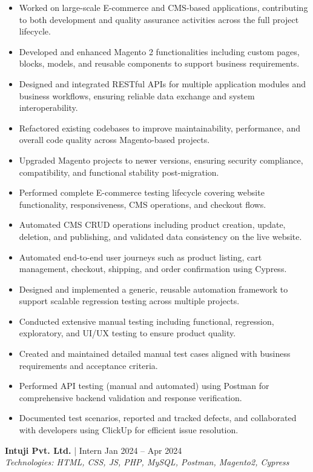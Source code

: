 \documentclass[a4paper,10pt]{article}
\begin{document}
\begin{itemize}
    \item Worked on large-scale E-commerce and CMS-based applications, contributing to both development and quality assurance activities across the full project lifecycle.
    \item Developed and enhanced Magento 2 functionalities including custom pages, blocks, models, and reusable components to support business requirements.
    \item Designed and integrated RESTful APIs for multiple application modules and business workflows, ensuring reliable data exchange and system interoperability.
    \item Refactored existing codebases to improve maintainability, performance, and overall code quality across Magento-based projects.
    \item Upgraded Magento projects to newer versions, ensuring security compliance, compatibility, and functional stability post-migration.
    \item Performed complete E-commerce testing lifecycle covering website functionality, responsiveness, CMS operations, and checkout flows.
    \item Automated CMS CRUD operations including product creation, update, deletion, and publishing, and validated data consistency on the live website.
    \item Automated end-to-end user journeys such as product listing, cart management, checkout, shipping, and order confirmation using Cypress.
    \item Designed and implemented a generic, reusable automation framework to support scalable regression testing across multiple projects.
    \item Conducted extensive manual testing including functional, regression, exploratory, and UI/UX testing to ensure product quality.
    \item Created and maintained detailed manual test cases aligned with business requirements and acceptance criteria.
    \item Performed API testing (manual and automated) using Postman for comprehensive backend validation and response verification.
    \item Documented test scenarios, reported and tracked defects, and collaborated with developers using ClickUp for efficient issue resolution.
\end{itemize}

\textbf{Intuji Pvt. Ltd.} | Intern \hfill Jan 2024 -- Apr 2024 \\
\textit{Technologies: HTML, CSS, JS, PHP, MySQL, Postman, Magento2, Cypress}
\end{document}
